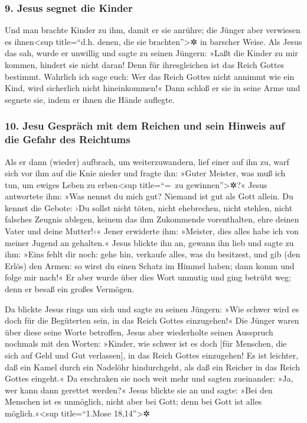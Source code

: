 \hypertarget{jesus-segnet-die-kinder}{%
\subsubsection{9. Jesus segnet die
Kinder}\label{jesus-segnet-die-kinder}}

 Und man brachte Kinder zu ihm, damit er sie anrühre; die
Jünger aber verwiesen es ihnen\textless sup title=``d.h. denen, die sie
brachten''\textgreater✲ in barscher Weise.  Als Jesus das
sah, wurde er unwillig und sagte zu seinen Jüngern: »Laßt die Kinder zu
mir kommen, hindert sie nicht daran! Denn für ihresgleichen ist das
Reich Gottes bestimmt.  Wahrlich ich sage euch: Wer das
Reich Gottes nicht annimmt wie ein Kind, wird sicherlich nicht
hineinkommen!«  Dann schloß er sie in seine Arme und
segnete sie, indem er ihnen die Hände auflegte.

\hypertarget{jesu-gespruxe4ch-mit-dem-reichen-und-sein-hinweis-auf-die-gefahr-des-reichtums}{%
\subsubsection{10. Jesu Gespräch mit dem Reichen und sein Hinweis auf
die Gefahr des
Reichtums}\label{jesu-gespruxe4ch-mit-dem-reichen-und-sein-hinweis-auf-die-gefahr-des-reichtums}}

 Als er dann (wieder) aufbrach, um weiterzuwandern, lief
einer auf ihn zu, warf sich vor ihm auf die Knie nieder und fragte ihn:
»Guter Meister, was muß ich tun, um ewiges Leben zu erben\textless sup
title=``=~zu gewinnen''\textgreater✲?«  Jesus antwortete
ihm: »Was nennst du mich gut? Niemand ist gut als Gott allein.
 Du kennst die Gebote: ›Du sollst nicht töten, nicht
ehebrechen, nicht stehlen, nicht falsches Zeugnis ablegen, keinem das
ihm Zukommende vorenthalten, ehre deinen Vater und deine Mutter!‹«
 Jener erwiderte ihm: »Meister, dies alles habe ich von
meiner Jugend an gehalten.«  Jesus blickte ihn an, gewann
ihn lieb und sagte zu ihm: »Eins fehlt dir noch: gehe hin, verkaufe
alles, was du besitzest, und gib (den Erlös) den Armen: so wirst du
einen Schatz im Himmel haben; dann komm und folge mir nach!«
 Er aber wurde über dies Wort unmutig und ging betrübt
weg; denn er besaß ein großes Vermögen.

 Da blickte Jesus rings um sich und sagte zu seinen
Jüngern: »Wie schwer wird es doch für die Begüterten sein, in das Reich
Gottes einzugehen!«  Die Jünger waren über diese seine
Worte betroffen, Jesus aber wiederholte seinen Ausspruch nochmals mit
den Worten: »Kinder, wie schwer ist es doch {[}für Menschen, die sich
auf Geld und Gut verlassen{]}, in das Reich Gottes einzugehen!
 Es ist leichter, daß ein Kamel durch ein Nadelöhr
hindurchgeht, als daß ein Reicher in das Reich Gottes eingeht.«
 Da erschraken sie noch weit mehr und sagten zueinander:
»Ja, wer kann dann gerettet werden?«  Jesus blickte sie
an und sagte: »Bei den Menschen ist es unmöglich, nicht aber bei Gott;
denn bei Gott ist alles möglich.«\textless sup title=``1.Mose
18,14''\textgreater✲

